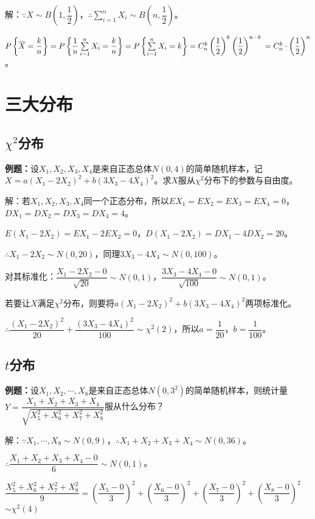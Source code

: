 解：$\because X\sim B\left(1,\dfrac{1}{2}\right)$，$\therefore\sum\limits_{i=1}^nX_i\sim B\left(n,\dfrac{1}{2}\right)$。

$P\left\{\overline{X}=\dfrac{k}{n}\right\}=P\left\{\dfrac{1}{n}\sum\limits_{i=1}^nX_i=\dfrac{k}{n}\right\}=P\left\{\sum\limits_{i=1}^nX_i=k\right\}=C_n^k\left(\dfrac{1}{2}\right)^k\left(\dfrac{1}{2}\right)^{n-k}\\=C_n^k\cdot\left(\dfrac{1}{2}\right)^n$。

\section{三大分布}

\subsection{\texorpdfstring{$\chi^2$分布}{}}

\textbf{例题：}设$X_1,X_2,X_3,X_4$是来自正态总体$N(0,4)$的简单随机样本，记$X=a(X_1-2X_2)^2+b(3X_3-4X_4)^2$。求$X$服从$\chi^2$分布下的参数与自由度。

解：若$X_1,X_2,X_3,X_4$同一个正态分布，所以$EX_1=EX_2=EX_3=EX_4=0$，$DX_1=DX_2=DX_3=DX_4=4$。

$E(X_1-2X_2)=EX_1-2EX_2=0$，$D(X_1-2X_2)=DX_1-4DX_2=20$。

$\therefore X_1-2X_2\sim N(0,20)$，同理$3X_3-4X_4\sim N(0,100)$。

对其标准化：$\dfrac{X_1-2X_2-0}{\sqrt{20}}\sim N(0,1)$，$\dfrac{3X_3-4X_4-0}{\sqrt{100}}\sim N(0,1)$。

若要让$X$满足$\chi^2$分布，则要将$a(X_1-2X_2)^2+b(3X_3-4X_4)^2$两项标准化。

$\therefore\dfrac{(X_1-2X_2)^2}{20}+\dfrac{(3X_3-4X_4)^2}{100}\sim\chi^2(2)$，所以$a=\dfrac{1}{20}$，$b=\dfrac{1}{100}$。

\subsection{\texorpdfstring{$t$分布}{}}

\textbf{例题：}设$X_1,X_2,\cdots,X_8$是来自正态总体$N(0,3^2)$的简单随机样本，则统计量$Y=\dfrac{X_1+X_2+X_3+X_4}{\sqrt{X_5^2+X_6^2+X_7^2+X_8^2}}$服从什么分布？

解：$\because X_1,\cdots,X_8\sim N(0,9)$，$\therefore X_1+X_2+X_3+X_4\sim N(0,36)$。

$\therefore\dfrac{X_1+X_2+X_3+X_4-0}{6}\sim N(0,1)$。

$\dfrac{X_5^2+X_6^2+X_7^2+X_8^2}{9}=\left(\dfrac{X_5-0}{3}\right)^2+\left(\dfrac{X_6-0}{3}\right)^2+\left(\dfrac{X_7-0}{3}\right)^2+\left(\dfrac{X_8-0}{3}\right)^2$\\$\sim\chi^2(4)$

